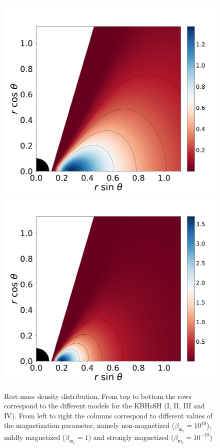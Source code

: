 \documentclass[twocolumn,aps,showpacs,showkeys,prd,superscriptaddress,byrevtex, amsmath]{revtex4-1}
\begin{document}
\begin{figure}
\includegraphics[scale=0.14]{figures/fig1_IV_1.pdf}
\hspace{-0.2cm}
\includegraphics[scale=0.14]{figures/fig1_IV__10.pdf}
\hspace{-0.2cm}
\caption{Rest-mass density distribution. From top to bottom the rows correspond to the different models for the KBHsSH (I, II, III and IV). From left to right the columns correspond to different values of the magnetization parameter, namely non-magnetized ($\beta_{\mathrm{m}_{\mathrm{c}}} = 10^{10}$), mildly magnetized ($\beta_{\mathrm{m}_{\mathrm{c}}} = 1$) and strongly magnetized ($\beta_{\mathrm{m}_{\mathrm{c}}} = 10^{-10}$)}
\label{models_I}
\end{figure}
\end{document}

